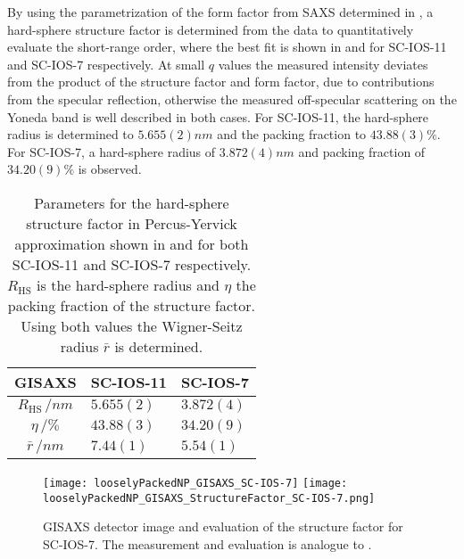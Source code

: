 \documentclass[\main/dresen_thesis.tex]{subfiles}
\begin{document}
  By using the parametrization of the form factor from SAXS determined in , a hard-sphere structure factor is determined from the data to quantitatively evaluate the short-range order, where the best fit is shown in  and  for SC-IOS-11 and SC-IOS-7 respectively.
  At small $q$ values the measured intensity deviates from the product of the structure factor and form factor, due to contributions from the specular reflection, otherwise the measured off-specular scattering on the Yoneda band is well described in both cases.
  For SC-IOS-11, the hard-sphere radius is determined to $5.655(2) \unit{nm}$ and the packing fraction to $43.88(3) \%$.
  For SC-IOS-7, a hard-sphere radius of $3.872(4) \unit{nm}$ and packing fraction of $34.20(9) \%$ is observed.
  \begin{table}[tb]
    \centering
    \caption{\label{tab:looselyPackedNP:nanoparticle:gisaxs}Parameters for the hard-sphere structure factor in Percus-Yervick approximation shown in  and  for both SC-IOS-11 and SC-IOS-7 respectively. $R_\mathrm{HS}$ is the hard-sphere radius and $\eta$ the packing fraction of the structure factor. Using both values the Wigner-Seitz radius $\bar{r}$ is determined.}
    \begin{tabular}{ c | l | l }
      \rule{0pt}{2ex} \textbf{GISAXS}  & \textbf{SC-IOS-11} & \textbf{SC-IOS-7} \\
      \hline
      \rule{0pt}{2ex} $R_\mathrm{HS} \, / \unit{nm}$          & $5.655(2)$           & $3.872(4)$\\
      \rule{0pt}{2ex} $\eta          \, / \unit{\%}$          & $43.88(3)$           & $34.20(9)$\\
      \hline
      \rule{0pt}{2ex} $\bar{r}       \, / \unit{nm}$          & $7.44(1)$            & $5.54(1)$\\
      \hline
    \end{tabular}
  \end{table}
  \begin{figure}[tb]
    \centering
    \texttt{[image: looselyPackedNP\_GISAXS\_SC-IOS-7]}
    \texttt{[image: looselyPackedNP\_GISAXS\_StructureFactor\_SC-IOS-7.png]}
    \caption{\label{fig:looselyPackedNP:layer:gisaxsSC_IOS_7}GISAXS detector image and evaluation of the structure factor for SC-IOS-7. The measurement and evaluation is analogue to .}
  \end{figure}
\end{document}

